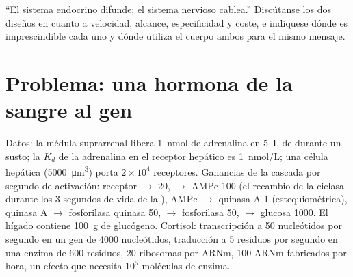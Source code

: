 \begin{exercise}[$\star\star\star$]\label{exo:b2:cell-signalling:12}
``El sistema endocrino difunde; el sistema nervioso cablea.''
Discútanse los dos diseños en cuanto a velocidad, alcance, especificidad y
coste, e indíquese dónde es imprescindible cada uno y dónde utiliza el
cuerpo ambos para el mismo mensaje.
\end{exercise}

\section{Problema: una hormona de la sangre al gen}

\begin{problem}
\label{pb:b2:cell-signalling:1}
Datos: la médula suprarrenal libera \qty{1}{nmol} de adrenalina en
\qty{5}{L} de  durante un susto; la $K_d$ de la adrenalina en el
receptor hepático es \qty{1}{nmol/L}; una célula hepática
(\qty{5000}{\micro m^3}) porta $2\times 10^{4}$ receptores. Ganancias de
la cascada por segundo de activación: receptor $\to$  20,
 $\to$ AMPc 100 (el recambio de la ciclasa durante los
3 segundos de vida de la ), AMPc $\to$ quinasa A 1
(estequiométrica), quinasa A $\to$ fosforilasa quinasa 50, $\to$
fosforilasa 50, $\to$ glucosa 1000. El hígado contiene \qty{100}{g} de
glucógeno. Cortisol: transcripción a \qty{50}{} nucleótidos por segundo
en un gen de \qty{4000}{} nucleótidos, traducción a \qty{5}{} residuos por
segundo en una enzima de \num{600} residuos, \num{20} ribosomas por ARNm,
\num{100} ARNm fabricados por hora, un efecto que necesita $10^{5}$
moléculas de enzima.


\end{problem}
